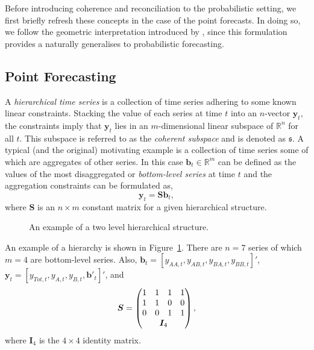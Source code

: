 \documentclass[12pt]{article}
\theoremstyle{definition}
\begin{document}
Before introducing coherence and reconciliation to the probabilistic setting, we first briefly refresh these concepts in the case of the point forecasts.  In doing so, we follow the geometric interpretation introduced by \cite{PanEtAl2019HF}, since this formulation provides a naturally generalises to probabilistic forecasting.


\subsection{Point Forecasting}\label{sec:PointForecasts}

A \emph{hierarchical time series} is a collection of time series adhering to some known linear constraints.  Stacking the value of each series at time $t$ into an $n$-vector ${\bm y}_t$, the constraints imply that ${\bm y}_t$ lies in an $m$-dimensional linear subspace of $\mathbb{R}^n$ for all $t$.  This subspace is referred to as the {\em coherent subspace} and is denoted as $\mathfrak{s}$.  A typical (and the original) motivating example is a collection of time series some of which are aggregates of other series. In this case $\bm{b}_t \in \mathbb{R}^m$ can be defined as the values of the most disaggregated or \emph{bottom-level series} at time $t$ and the aggregation constraints can be formulated as,
\begin{equation*}
\bm{y}_t = \bm{Sb}_t,
\end{equation*}
where $\bm{S}$ is an $n \times m$ constant matrix for a given hierarchical structure.

\begin{figure}[H]
	\begin{center}
		 
		 
		\qobitree
	\end{center}
	\caption{An example of a two level hierarchical structure.}\label{fig:twoL-hier}
\end{figure}
An example of a hierarchy is shown in Figure~\ref{fig:twoL-hier}. There are $n=7$ series of which $m=4$ are bottom-level series. Also, $\bm{b}_t = [y_{AA,t}, y_{AB,t}, y_{BA,t}, y_{BB,t}]'$, $\bm{y}_t = [y_{Tot,t},y_{A,t}, y_{B,t},\bm{b}'_t]'$,  and
\[
\bm{S} = \begin{pmatrix}
1 & 1 & 1 & 1 \\
1 & 1 & 0 & 0 \\
0 & 0 & 1 & 1 \\
& \multicolumn{2}{c}{\bm{I}_4} &
\end{pmatrix},
\]
where $\bm{I}_4$ is the $4\times 4$ identity matrix.
\end{document}
